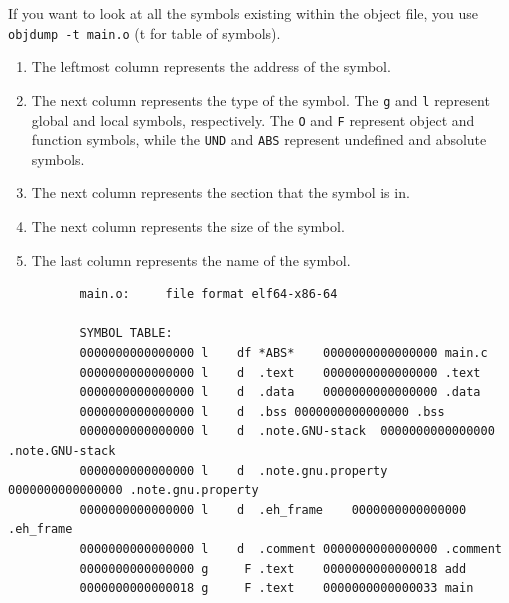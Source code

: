 \documentclass{article}
\begin{document}
      \begin{theorem}
        If you want to look at all the symbols existing within the object file, you use \texttt{objdump -t main.o} (t for table of symbols). 
        \begin{enumerate}
          \item The leftmost column represents the address of the symbol. 
          \item The next column represents the type of the symbol. The \texttt{g} and \texttt{l} represent global and local symbols, respectively. The \texttt{O} and \texttt{F} represent object and function symbols, while the \texttt{UND} and \texttt{ABS} represent undefined and absolute symbols. 
          \item The next column represents the section that the symbol is in. 
          \item The next column represents the size of the symbol. 
          \item The last column represents the name of the symbol. 
        \end{enumerate}
        \begin{lstlisting}
          main.o:     file format elf64-x86-64

          SYMBOL TABLE:
          0000000000000000 l    df *ABS*	0000000000000000 main.c
          0000000000000000 l    d  .text	0000000000000000 .text
          0000000000000000 l    d  .data	0000000000000000 .data
          0000000000000000 l    d  .bss	0000000000000000 .bss
          0000000000000000 l    d  .note.GNU-stack	0000000000000000 .note.GNU-stack
          0000000000000000 l    d  .note.gnu.property	0000000000000000 .note.gnu.property
          0000000000000000 l    d  .eh_frame	0000000000000000 .eh_frame
          0000000000000000 l    d  .comment	0000000000000000 .comment
          0000000000000000 g     F .text	0000000000000018 add
          0000000000000018 g     F .text	0000000000000033 main
        \end{lstlisting}
      \end{theorem}
\end{document}

